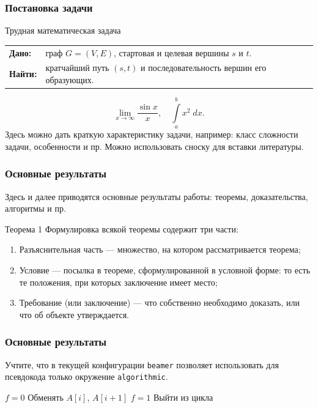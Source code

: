 \documentclass[12pt, aspectratio=1610]{beamer}
\begin{document}
\begin{frame}
		\justifying
		\frametitle{Постановка задачи}
		\begin{block}{Трудная математическая задача}
		\begin{tabular}{ll}
		\textbf{Дано:} & граф $G=(V,E)$, стартовая и целевая вершины $s$ и $t$.\\
		\textbf{Найти:} & кратчайший путь $(s,t)$ и последовательность вершин его образующих.
		\end{tabular}
		\end{block}
		\begin{equation*}
			\lim\limits_{x\rightarrow\infty}{\frac{\sin x}{x}},\quad \int\limits_a^b{x^2\;dx}.
		\end{equation*}
		Здесь можно дать краткую характеристику задачи, например: класс сложности задачи, особенности и пр.
		Можно использовать сноску для вставки литературы\footnotemark.

\end{frame}	

\begin{frame}
	\justifying
	\frametitle{Основные результаты}
	Здесь и далее приводятся основные результаты работы: теоремы, доказательства, алгоритмы и пр.
	\begin{block}{Теорема 1}
		Формулировка всякой теоремы содержит три части:
		\begin{enumerate}
			\item Разъяснительная часть — множество, на котором рассматривается теорема;
			\item Условие — посылка в теореме, сформулированной в условной форме: то есть те положения, при которых заключение имеет место;
			\item Требование (или заключение) — что собственно необходимо доказать, или что об объекте утверждается.
		\end{enumerate}		
	\end{block}
\end{frame}


\begin{frame}[fragile]
	\justifying
	\frametitle{Основные результаты}
	Учтите, что в текущей конфигурации \verb|beamer| позволяет использовать для псевдокода только окружение \verb|algorithmic|.
	\begin{algorithmic}[1]%
	\scriptsize
		\State $f=0$
				\State Обменять $A[i]$, $A[i+1]$
				\State $f=1$
			\EndIf
				\State Выйти из цикла
			\EndIf
		\EndFor
	\EndFor
	\end{algorithmic}
	
\end{frame}
\end{document}
